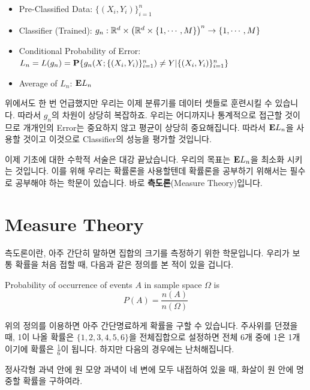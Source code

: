 \documentclass[final]{IEEEphot}
\begin{document}
\begin{itemize}
 \item Pre-Classified Data: $\{(X_i, Y_i)\}^n_{i=1}$
 \item Classifier (Trained): $g_n: \mathbb{R}^d\times \left(\mathbb{R}^d \times \{1,\cdots,M\}\right )^n \rightarrow \{1,\cdots,M\}$
 \item Conditional Probability of Error: $L_n = L(g_n) = \mathbf{P}\{g_n(X; \{(X_i, Y_i)\}^n_{i=1})\neq Y | \{(X_i, Y_i)\}^n_{i=1} \}$
 \item Average of $L_n$: $\mathbf{E}  L_n$
\end{itemize}

위에서도 한 번 언급했지만 우리는 이제 분류기를 데이터 셋들로 훈련시킬 수 있습니다. 따라서 $g_n$의 차원이 상당히 복잡하죠. 
우리는 어디까지나 통계적으로 접근할 것이므로 개개인의 Error는 중요하지 않고 평균이 상당히 중요해집니다. 따라서 $\mathbf{E} L_n$을 사용할 것이고 이것으로 Classifier의 성능을 평가할 것입니다. 

\HS 이제 기초에 대한 수학적 서술은 대강 끝났습니다. 우리의 목표는 $\mathbf{E} L_n$을 최소화 시키는 것입니다. 이를 위해 우리는 확률론을 사용할텐데 확률론을 공부하기 위해서는 필수로 공부해야 하는 학문이 있습니다. 바로 \textbf{측도론}(Measure Theory)입니다.

\newpage

\section[Measure Theory]{Measure Theory} 

측도론이란, 아주 간단히 말하면 집합의 크기를 측정하기 위한 학문입니다. 우리가 보통 확률을 처음 접할 때, 다음과 같은 정의를 본 적이 있을 겁니다.

\begin{example}
 Probability of occurrence of events $A$ in sample space $\Omega$ is
 \begin{equation*}
  P(A) = \frac{n(A)}{n(\Omega)}
 \end{equation*}
 \HL
\end{example}

위의 정의를 이용하면 아주 간단명료하게 확률을 구할 수 있습니다. 주사위를 던졌을 때, 1이 나올 확률은 $\{1,2,3,4,5,6\}$을 전체집합으로 설정하면 전체 6개 중에 1은 1개이기에 확률은 $\frac{1}{6}$이 됩니다. 하지만 다음의 경우에는 난처해집니다.

\begin{example}
 정사각형 과녁 안에 원 모양 과녁이 네 변에 모두 내접하여 있을 때, 화살이 원 안에 명중할 확률을 구하여라.
 
 \HL
\end{example}
\end{document}
